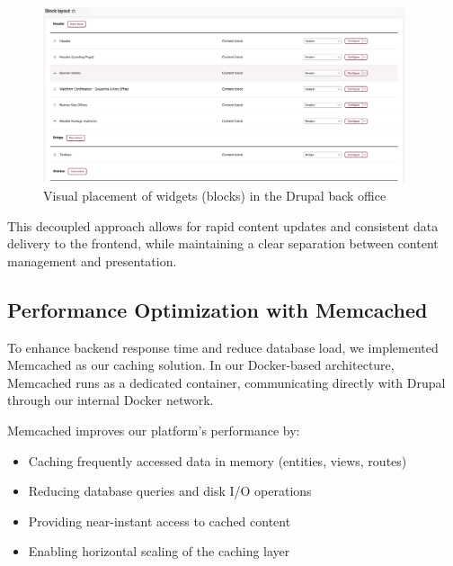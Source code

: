 \begin{figure}[H]
    \centering
    \includegraphics[width=0.95\textwidth]{images/structuring-page-BO.png}
    \caption{Visual placement of widgets (blocks) in the Drupal back office}
    \label{fig:drupal_block_layout}
\end{figure}

This decoupled approach allows for rapid content updates and consistent data delivery to the frontend, while maintaining a clear separation between content management and presentation.





\subsection{Performance Optimization with Memcached}
To enhance backend response time and reduce database load, we implemented Memcached as our caching solution. In our Docker-based architecture, Memcached runs as a dedicated container, communicating directly with Drupal through our internal Docker network.

Memcached improves our platform's performance by:
\begin{itemize}
    \item Caching frequently accessed data in memory (entities, views, routes)
    \item Reducing database queries and disk I/O operations
    \item Providing near-instant access to cached content
    \item Enabling horizontal scaling of the caching layer
\end{itemize}

